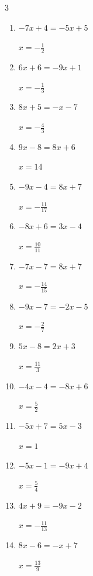 \begin{multicols}{3}
\begin{enumerate}
        $\displaystyle x=-\frac{1}{2}$

  \item $-7x+4=-5x+5$

        $\displaystyle x=-\frac{1}{2}$

\columnbreak %

  \item $6x+6=-9x+1$

        $\displaystyle x=-\frac{1}{3}$

  \item $8x+5=-x-7$

        $\displaystyle x=-\frac{4}{3}$

  \item $9x-8=8x+6$

        $\displaystyle x=14$

  \item $-9x-4=8x+7$

        $\displaystyle x=-\frac{11}{17}$

  \item $-8x+6=3x-4$

        $\displaystyle x=\frac{10}{11}$

  \item $-7x-7=8x+7$

        $\displaystyle x=-\frac{14}{15}$

  \item $-9x-7=-2x-5$

        $\displaystyle x=-\frac{2}{7}$

  \item $5x-8=2x+3$

        $\displaystyle x=\frac{11}{3}$

  \item $-4x-4=-8x+6$

        $\displaystyle x=\frac{5}{2}$

  \item $-5x+7=5x-3$

        $\displaystyle x=1$

  \item $-5x-1=-9x+4$

        $\displaystyle x=\frac{5}{4}$

  \item $4x+9=-9x-2$

        $\displaystyle x=-\frac{11}{13}$

  \item $8x-6=-x+7$

        $\displaystyle x=\frac{13}{9}$


\end{enumerate}
\end{multicols}
